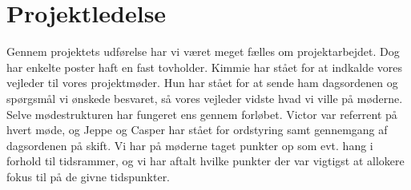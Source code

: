 \section{Projektledelse}

Gennem projektets udførelse har vi været meget fælles om projektarbejdet. Dog har enkelte poster haft en fast tovholder. Kimmie har stået for at indkalde vores vejleder til vores projektmøder. Hun har stået for at sende ham dagsordenen og spørgsmål vi ønskede besvaret, så vores vejleder vidste hvad vi ville på møderne. 
Selve mødestrukturen har fungeret ens gennem forløbet. Victor var referrent på hvert møde, og Jeppe og Casper har stået for ordstyring samt gennemgang af dagsordenen på skift. 
Vi har på møderne taget punkter op som evt. hang i forhold til tidsrammer, og vi har aftalt hvilke punkter der var vigtigst at allokere fokus til på de givne tidspunkter.